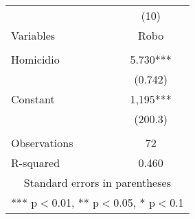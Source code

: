 \begin{tabular}{lc} \\\hline
\label{tab:cointegracion}
 & (10) \\
Variables & Robo \\ \hline
 &  \\
Homicidio & 5.730*** \\
 & (0.742) \\
Constant & 1,195*** \\
 & (200.3) \\
 &  \\
Observations & 72 \\
 R-squared & 0.460 \\ \hline
\multicolumn{2}{c}{ Standard errors in parentheses} \\
\multicolumn{2}{c}{ *** p$<$0.01, ** p$<$0.05, * p$<$0.1} \\
\end{tabular}
